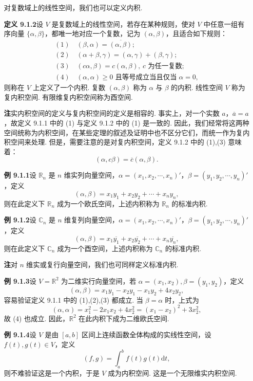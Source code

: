 \documentclass[UTF8,12pt,a4paper,fontset=fandol]{ctexart}
\begin{document}
对复数域上的线性空间，我们也可以定义内积.

\noindent\textbf{定义 9.1.2}\quad 设 $V$ 是复数域上的线性空间，若存在某种规则，使对 $V$ 中任意一组有序向量 $\{\alpha,\beta\}$，都唯一地对应一个复数，记为 $(\alpha,\beta)$，且适合如下规则：
\[
\begin{gathered}
  (1)\quad (\beta,\alpha)=\overline{(\alpha,\beta)};\\
  (2)\quad (\alpha+\beta,\gamma)=(\alpha,\gamma)+(\beta,\gamma);\\
  (3)\quad (c\alpha,\beta)=c(\alpha,\beta),\ c\text{ 为任一复数};\\
  (4)\quad (\alpha,\alpha)\ge0\text{ 且等号成立当且仅当 }\alpha=0,
\end{gathered}
\]
则称在 $V$ 上定义了一个内积. 复数 $(\alpha,\beta)$ 称为 $\alpha$ 与 $\beta$ 的内积. 线性空间 $V$ 称为复内积空间. 有限维复内积空间称为酉空间.

\noindent\textbf{注}\quad 实内积空间的定义与复内积空间的定义是相容的. 事实上，对一个实数 $a$，$\overline a=a$，故定义 9.1.1 中的 (1) 与定义 9.1.2 中的 (1) 是一致的. 因此，我们经常将这两种空间统称为内积空间，在某些定理的叙述及证明中也不区分它们，而统一作为复内积空间来处理. 但是，需要注意的是对复内积空间，定义 9.1.2 中的 (1),(3) 意味着：
\[
  (\alpha,c\beta)=\overline c(\alpha,\beta).
\]

\noindent\textbf{例 9.1.1}\quad 设 $\mathbb R_n$ 是 $n$ 维实列向量空间，$\alpha=(x_1,x_2,\cdots,x_n)'$，$\beta=(y_1,y_2,\cdots,y_n)'$，定义
\[
  (\alpha,\beta)=x_1y_1+x_2y_2+\cdots+x_ny_n,
\]
则在此定义下 $\mathbb R_n$ 成为一个欧氏空间，上述内积称为 $\mathbb R_n$ 的标准内积.

\noindent\textbf{例 9.1.2}\quad 设 $\mathbb C_n$ 是 $n$ 维复列向量空间，$\alpha=(x_1,x_2,\cdots,x_n)'$，$\beta=(y_1,y_2,\cdots,y_n)'$，定义
\[
  (\alpha,\beta)=x_1\overline{y_1}+x_2\overline{y_2}+\cdots+x_n\overline{y_n},
\]
则在此定义下 $\mathbb C_n$ 成为一个酉空间，上述内积称为 $\mathbb C_n$ 的标准内积.

\noindent\textbf{注}\quad 对 $n$ 维实或复行向量空间，我们也可同样定义标准内积.

\noindent\textbf{例 9.1.3}\quad 设 $V=\mathbb R^2$ 为二维实行向量空间，若 $\alpha=(x_1,x_2),\beta=(y_1,y_2)$，定义
\[
  (\alpha,\beta)=x_1y_1-x_2y_1-x_1y_2+4x_2y_2,
\]
容易验证定义 9.1.1 中的 (1),(2),(3) 都成立. 当 $\beta=\alpha$ 时，上式为
\[
  (\alpha,\alpha)=x_1^2-2x_1x_2+4x_2^2=(x_1-x_2)^2+3x_2^2,
\]
故 (4) 也成立. 因此，$\mathbb R^2$ 在此内积下成为二维欧氏空间.

\noindent\textbf{例 9.1.4}\quad 设 $V$ 是由 $[a,b]$ 区间上连续函数全体构成的实线性空间，设 $f(t),g(t)\in V$，定义
\[
  (f,g)=\int_a^b f(t)g(t)\mathrm dt,
\]
则不难验证这是一个内积，于是 $V$ 成为内积空间. 这是一个无限维实内积空间.
\end{document}

